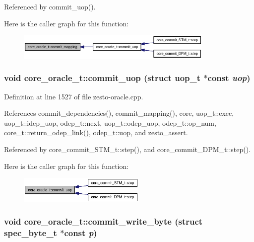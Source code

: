 Referenced by commit\_\-uop().

Here is the caller graph for this function:\nopagebreak
\begin{figure}[H]
\begin{center}
\leavevmode
\includegraphics[width=269pt]{classcore__oracle__t_9c6462ead2fb5d7d4134ff11fc918029_icgraph}
\end{center}
\end{figure}
\subsubsection[{commit\_\-uop}]{\setlength{\rightskip}{0pt plus 5cm}void core\_\-oracle\_\-t::commit\_\-uop (struct {\bf uop\_\-t} $\ast$const  {\em uop})}\label{classcore__oracle__t_ba02df09c524181a44404676f33669a5}




Definition at line 1527 of file zesto-oracle.cpp.

References commit\_\-dependencies(), commit\_\-mapping(), core, uop\_\-t::exec, uop\_\-t::idep\_\-uop, odep\_\-t::next, uop\_\-t::odep\_\-uop, odep\_\-t::op\_\-num, core\_\-t::return\_\-odep\_\-link(), odep\_\-t::uop, and zesto\_\-assert.

Referenced by core\_\-commit\_\-STM\_\-t::step(), and core\_\-commit\_\-DPM\_\-t::step().

Here is the caller graph for this function:\nopagebreak
\begin{figure}[H]
\begin{center}
\leavevmode
\includegraphics[width=173pt]{classcore__oracle__t_ba02df09c524181a44404676f33669a5_icgraph}
\end{center}
\end{figure}
\subsubsection[{commit\_\-write\_\-byte}]{\setlength{\rightskip}{0pt plus 5cm}void core\_\-oracle\_\-t::commit\_\-write\_\-byte (struct {\bf spec\_\-byte\_\-t} $\ast$const  {\em p})\hspace{0.3cm}{\tt  [protected]}}\label{classcore__oracle__t_084f475b2682976f22fbad98943ac04f}




